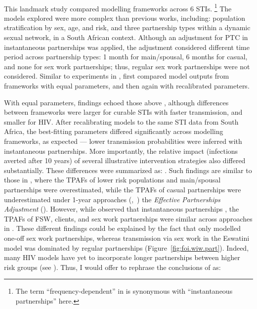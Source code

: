 \paragraph{\citet{Johnson2016mf}}
This landmark study compared modelling frameworks across 6 STIs.%
\footnote{The term ``frequency-dependent'' in \cite{Johnson2016mf} is synonymous with
  ``instantaneous partnerships'' here.}
The models explored were more complex than previous works, including:
population stratification by sex, age, and risk,
and three partnership types within a dynamic sexual network, in a South African context.
Although an adjustment for PTC in instantaneous partnerships was applied,
the adjustment considered different time period across partnership types:
1 month for main/spousal, 6 months for casual, and none for sex work partnerships;
thus, regular sex work partnerships were not considered.
Similar to experiments in , \cite{Johnson2016mf} first compared
model outputs from frameworks with equal parameters, and then again with recalibrated parameters.
\par
With equal parameters, findings echoed those above \cite{Eames2002,Lloyd-Smith2004},
although differences between frameworks were larger for
curable STIs with faster transmission, and smaller for HIV.
After recalibrating models to the same STI data from South Africa,
the best-fitting parameters differed significantly across modelling frameworks, as expected
--- \eg lower transmission probabilities were inferred with instantaneous partnerships.
More importantly, the relative impact (infections averted after 10 years)
of several illustrative intervention strategies also differed substantially.
These differences were summarized as:
 \cite{Johnson2016mf}.
Such findings are similar to those in , where
the TPAFs of lower risk populations and main/spousal partnerships were overestimated, while
the TPAFs of casual partnerships were underestimated
under 1-year approaches (\iry,~\ipy) \vs the \emph{Effective Partnerships Adjustment} (\epa).
However, while \cite{Johnson2016mf} observed that instantaneous partnerships
,
the TPAFs of FSW, clients, and sex work partnerships
were similar across approaches in .
These different findings could be explained by the fact that
\cite{Johnson2016mf} only modelled one-off sex work partnerships,
whereas transmission via sex work in the Eswatini model
was dominated by regular partnerships (Figure~\ref{fig:foi.wiw.part}).
Indeed, many HIV models have yet to incorporate longer partnerships between higher risk groups
(see ).
Thus, I would offer to rephrase the conclusions of \cite{Johnson2016mf} as:
